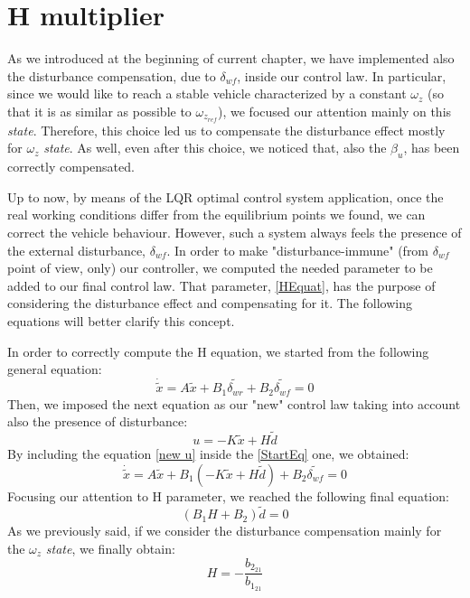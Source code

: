 \section{H multiplier} \label{H section}
As we introduced at the beginning of current chapter, we have implemented also the disturbance compensation, due to $\delta_{wf}$, inside our control law. In particular, since we would like to reach a stable vehicle characterized by a constant $\omega_{z}$ (so that it is as similar as possible to $\omega_{z_{ref}}$), we focused our attention mainly on this \textit{state}. Therefore, this choice led us to compensate the disturbance effect mostly for $\omega_{z}$ \textit{state}. As well, even after this choice, we noticed that, also the $\beta_{u}$, has been correctly compensated.

Up to now, by means of the LQR optimal control system application, once the real working conditions differ from the equilibrium points we found, we can correct the vehicle behaviour. However, such a system always feels the presence of the external disturbance, $\delta_{wf}$. In order to make "disturbance-immune" (from $\delta_{wf}$ point of view, only) our controller, we computed the needed parameter to be added to our final control law. That parameter, \ref{HEquat}, has the purpose of considering the disturbance effect and compensating for it.
The following equations will better clarify this concept.

In order to correctly compute the H equation, we started from the following general equation:
\begin{equation} \label{StartEq}
	\dot{\tilde{x}} = A \tilde{x} + B_{1}\tilde{\delta_{wr}} + B_{2}\tilde{\delta_{wf}} = 0
\end{equation}
Then, we imposed the next equation as our "new" control law taking into account also the presence of disturbance:
\begin{equation} \label{new u}
	u = - K \tilde{x} + H \tilde{d}
\end{equation}
By including the equation \ref{new u} inside the \ref{StartEq} one, we obtained:
\begin{equation}
	\dot{\tilde{x}} = A \tilde{x} + B_{1}(- K \tilde{x} + H \tilde{d}) + B_{2}\tilde{\delta_{wf}} = 0
\end{equation}
Focusing our attention to H parameter, we reached the following final equation:
\begin{equation}
 (B_{1} H + B_{2})\tilde{d} = 0
\end{equation}
As we previously said, if we consider the disturbance compensation mainly for the $\omega_{z}$ \textit{state}, we finally obtain:
\begin{equation}
\label{HEquat}
H = -\frac{b_{{2}_{21}}}{b_{{1}_{21}}}
\end{equation}
